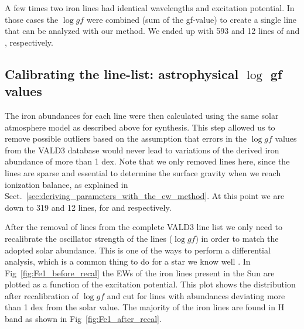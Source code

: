 \documentclass{aa}
\begin{document}
A few times two iron lines had identical wavelengths and excitation
potential. In those cases the $\log \mathit{gf}$ were combined (sum
of the gf-value) to create a single line that can be analyzed with
our method. We ended up with 593 and 12 lines of  and
, respectively.


\subsection{Calibrating the line-list: astrophysical $\log$ gf values}
\label{ssub:Recalibrating-the-atomic-data}

The iron abundances for each line were then calculated using the
same solar atmosphere model as described above for synthesis. This
step allowed us to remove possible outliers based on the assumption
that errors in the $\log \mathit{gf}$ values from the VALD3 database
would never lead to variations of the derived iron abundance of more
than 1 dex. Note that we only removed  lines here, since
the  lines are sparse and essential to determine the
surface gravity when we reach ionization balance, as explained in
Sect.~\ref{sec:deriving_parameters_with_the_ew_method}. At this point
we are down to 319 and 12 lines, for  and 
respectively.

After the removal of lines from the complete VALD3 line list we only
need to recalibrate the oscillator strength of the lines ($\log
\mathit{gf}$) in order to match the adopted solar abundance. This is
one of the ways to perform a differential analysis, which is a common
thing to do for a star we know well \citep{Sousa2008a,Onehag2012}. In
Fig~\ref{fig:Fe1_before_recal} the EWs of the iron lines present in
the Sun are plotted as a function of the excitation potential. This
plot shows the distribution after recalibration of $\log gf$ and cut
for lines with abundances deviating more than 1 dex from the solar
value. The majority of the iron lines are found in H band as shown in
Fig~\ref{fig:Fe1_after_recal}.
\end{document}
